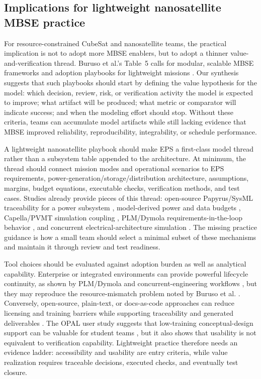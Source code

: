 \subsection{Implications for lightweight nanosatellite MBSE practice}
\label{sec:discussion-practice-implications}

For resource-constrained CubeSat and nanosatellite teams, the practical implication is not to adopt more MBSE enablers, but to adopt a thinner value-and-verification thread.  Buruso et al.'s Table~5 calls for modular, scalable MBSE frameworks and adoption playbooks for lightweight missions \cite{Buruso2026MBSESpace}.  Our synthesis suggests that such playbooks should start by defining the value hypothesis for the model: which decision, review, risk, or verification activity the model is expected to improve; what artifact will be produced; what metric or comparator will indicate success; and when the modeling effort should stop.  Without these criteria, teams can accumulate model artifacts while still lacking evidence that MBSE improved reliability, reproducibility, integrability, or schedule performance.

A lightweight nanosatellite playbook should make EPS a first-class model thread rather than a subsystem table appended to the architecture.  At minimum, the thread should connect mission modes and operational scenarios to EPS requirements, power-generation/storage/distribution architecture, assumptions, margins, budget equations, executable checks, verification methods, and test cases.  Studies already provide pieces of this thread: open-source Papyrus/SysML traceability for a power subsystem \cite{paper-0026}, model-derived power and data budgets \cite{paper-0029}, Capella/PVMT simulation coupling \cite{paper-0043}, PLM/Dymola requirements-in-the-loop behavior \cite{paper-0059}, and concurrent electrical-architecture simulation \cite{paper-0053}.  The missing practice guidance is how a small team should select a minimal subset of these mechanisms and maintain it through review and test readiness.

Tool choices should be evaluated against adoption burden as well as analytical capability.  Enterprise or integrated environments can provide powerful lifecycle continuity, as shown by PLM/Dymola and concurrent-engineering workflows \cite{paper-0059,paper-0053}, but they may reproduce the resource-mismatch problem noted by Buruso et al. \cite{Buruso2026MBSESpace}.  Conversely, open-source, plain-text, or docs-as-code approaches can reduce licensing and training barriers while supporting traceability and generated deliverables \cite{paper-0026,paper-0029,paper-0037}.  The OPAL user study suggests that low-training conceptual-design support can be valuable for student teams \cite{paper-0046}, but it also shows that usability is not equivalent to verification capability.  Lightweight practice therefore needs an evidence ladder: accessibility and usability are entry criteria, while value realization requires traceable decisions, executed checks, and eventually test closure.

